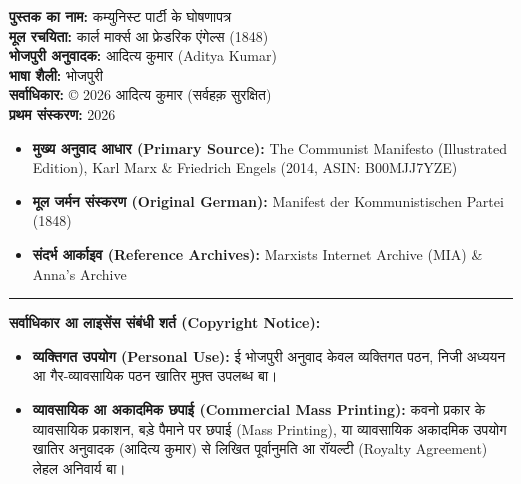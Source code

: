 \documentclass[12pt,a4paper,oneside]{book}
\begin{document}
\begin{center}
\begin{minipage}{0.92\textwidth}
  \small
  \setlength{\parskip}{0.3em}

  {\bfseries पुस्तक का नाम:} कम्युनिस्ट पार्टी के घोषणापत्र \\
  {\bfseries मूल रचयिता:} कार्ल मार्क्स आ फ्रेडरिक एंगेल्स (1848) \\
  {\bfseries भोजपुरी अनुवादक:} आदित्य कुमार {\engfont (Aditya Kumar)} \\
  {\bfseries भाषा शैली:} भोजपुरी \\
  {\bfseries सर्वाधिकार:} {\engfont \copyright} 2026 आदित्य कुमार (सर्वहक़ सुरक्षित) \\
  {\bfseries प्रथम संस्करण:} 2026

  \vspace*{0.4em}

  \begin{tcolorbox}[colframe=bordercolor, colback=matmaila!70!white, arc=3pt, boxrule=0.8pt, top=4pt, bottom=4pt, title={\bfseries अनुदित संस्करण विवरण {\engfont (Translated Edition Details)}}]
  \small
  \begin{itemize}\setlength{\itemsep}{0.1em}\setlength{\topsep}{0pt}\setlength{\parsep}{0pt}
    \item {\bfseries मुख्य अनुवाद आधार (Primary Source):} {\engfont The Communist Manifesto (Illustrated Edition), Karl Marx \& Friedrich Engels (2014, ASIN: B00MJJ7YZE)}
    \item {\bfseries मूल जर्मन संस्करण (Original German):} {\engfont Manifest der Kommunistischen Partei (1848)}
    \item {\bfseries संदर्भ आर्काइव (Reference Archives):} {\engfont Marxists Internet Archive (MIA) \& Anna's Archive}
  \end{itemize}
  \end{tcolorbox}

  \vspace*{0.4em}
  {\color{bordercolor}\rule{\textwidth}{0.4pt}}
  \vspace*{0.4em}

  {\bfseries सर्वाधिकार आ लाइसेंस संबंधी शर्त {\engfont (Copyright Notice)}:}

  \begin{itemize}\setlength{\itemsep}{0.2em}\setlength{\topsep}{0pt}\setlength{\parsep}{0pt}
    \item {\bfseries व्यक्तिगत उपयोग {\engfont (Personal Use)}:} ई भोजपुरी अनुवाद केवल व्यक्तिगत पठन, निजी अध्ययन आ गैर-व्यावसायिक पठन खातिर मुफ़्त उपलब्ध बा।
    \item {\bfseries व्यावसायिक आ अकादमिक छपाई {\engfont (Commercial Mass Printing)}:} कवनो प्रकार के व्यावसायिक प्रकाशन, बड़े पैमाने पर छपाई {\engfont (Mass Printing)}, या व्यावसायिक अकादमिक उपयोग खातिर अनुवादक (आदित्य कुमार) से लिखित पूर्वानुमति आ रॉयल्टी {\engfont (Royalty Agreement)} लेहल अनिवार्य बा।
  \end{itemize}


\end{minipage}
\end{center}
\end{document}
